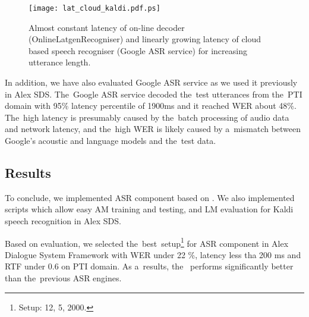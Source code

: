 \begin{figure*}[t]
    \begin{center}
    \texttt{[image: lat\_cloud\_kaldi.pdf.ps]}
    \caption{Almost constant latency of on-line decoder (OnlineLatgenRecogniser) and linearly growing latency of cloud based speech recogniser (Google ASR service) for increasing utterance length.}
    \label{fig:wer} 
    \end{center}
\end{figure*}

In addition, we have also evaluated Google ASR service as we used it previously in Alex \ac{SDS}.
The~Google ASR service decoded the~test utterances from the~PTI domain with 95\% latency percentile of 1900ms and it reached WER about 48\%.
The~high latency is presumably caused by the~batch processing of audio data and network latency, and the~high WER is likely caused by a~mismatch between Google's acoustic and language models and the~test data.

\subsection*{Results}
\label{sec:results}

To conclude, we implemented \ac{ASR} component based on .
We also implemented scripts which allow easy \ac{AM} training and testing, and \ac{LM} evaluation for Kaldi speech recognition in Alex \ac{SDS}.

Based on evaluation, we selected the~best~setup\footnote{Setup:  12,  5,  2000.} for ASR component in Alex Dialogue System Framework with  WER under 22 \%, latency less tha 200 ms and RTF under 0.6 on \ac{PTI} domain.
As a~results, the~ performs significantly better than the~previous \ac{ASR} engines.
